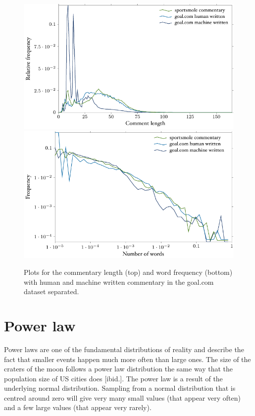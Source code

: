 \documentclass[10pt, a4paper]{UUThesisTemplate}
\begin{document}
\begin{figure}\centering
\includegraphics{figures/fig_commentary_full.pdf}\\
\includegraphics{figures/fig_word_freq_full.pdf}
\caption{Plots for the commentary length (top) and word frequency (bottom) with human and machine written commentary in the goal.com dataset separated.}\label{fig:commentarydetail}
\end{figure}

\section{Power law}

Power laws are one of the fundamental distributions of reality and describe the fact that smaller events happen much more often than large ones. The size of the craters of the moon follows a power law distribution \cite{morepowerlaw} the same way that the population size of US cities does [ibid.]. The power law is a result of the underlying normal distribution. Sampling from a normal distribution that is centred around zero will give very many small values (that appear very often) and a few large values (that appear very rarely). 
\end{document}
